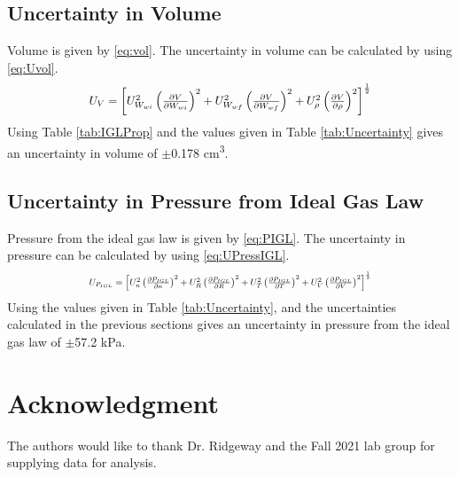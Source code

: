 \documentclass[10pt,journal,letterpaper]{IEEEtran}
\begin{document}
\subsection*{Uncertainty in Volume}

Volume is given by \eqref{eq:vol}.
The uncertainty in volume can be calculated by using \eqref{eq:Uvol}.
\begin{equation}
\label{eq:Uvol}
\resizebox{227pt}{!}{$U_{V}=\left[U_{W_{wi}}^2 \left(\frac{\partial V}{\partial W_{wi}}\right)^2 + U_{W_{wf}}^2 \left(\frac{\partial V}{\partial W_{wf}}\right)^2 + U_{\rho}^2 \left(\frac{\partial V}{\partial \rho}\right)^2 \right]^{\frac{1}{2}}$}
\end{equation}
Using Table \ref{tab:IGLProp} and the values given in Table \ref{tab:Uncertainty} gives an uncertainty in volume of $\pm$0.178 \unit{\centi\meter\cubed}.

\subsection*{Uncertainty in Pressure from Ideal Gas Law}

Pressure from the ideal gas law is given by \eqref{eq:PIGL}.
The uncertainty in pressure can be calculated by using \eqref{eq:UPressIGL}.
\begin{equation}
\label{eq:UPressIGL}
\resizebox{227pt}{!}{$U_{P_{IGL}}=\left[U_{n}^2 \left(\frac{\partial P_{IGL}}{\partial n}\right)^2 + U_{R}^2 \left(\frac{\partial P_{IGL}}{\partial R}\right)^2 + U_{T}^2 \left(\frac{\partial P_{IGL}}{\partial T}\right)^2 + U_{V}^2 \left(\frac{\partial P_{IGL}}{\partial V}\right)^2 \right]^{\frac{1}{2}}$}
\end{equation}
Using the values given in Table \ref{tab:Uncertainty}, and the uncertainties calculated in the previous sections gives an uncertainty in pressure from the ideal gas law of $\pm$57.2 kPa.


\section*{Acknowledgment}

The authors would like to thank Dr. Ridgeway and the Fall 2021 lab group for supplying data for analysis.
\end{document}
